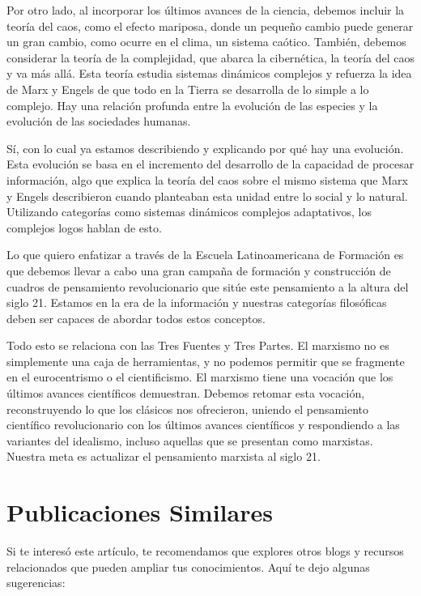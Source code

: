 \documentclass[
  jou,
  floatsintext,
  longtable,
  a4paper,
  nolmodern,
  notxfonts,
  notimes,
  12pt,
  colorlinks=true,linkcolor=blue,citecolor=blue,urlcolor=blue]{apa7}
\begin{document}
Por otro lado, al incorporar los últimos avances de la ciencia, debemos
incluir la teoría del caos, como el efecto mariposa, donde un pequeño
cambio puede generar un gran cambio, como ocurre en el clima, un sistema
caótico. También, debemos considerar la teoría de la complejidad, que
abarca la cibernética, la teoría del caos y va más allá. Esta teoría
estudia sistemas dinámicos complejos y refuerza la idea de Marx y Engels
de que todo en la Tierra se desarrolla de lo simple a lo complejo. Hay
una relación profunda entre la evolución de las especies y la evolución
de las sociedades humanas.

Sí, con lo cual ya estamos describiendo y explicando por qué hay una
evolución. Esta evolución se basa en el incremento del desarrollo de la
capacidad de procesar información, algo que explica la teoría del caos
sobre el mismo sistema que Marx y Engels describieron cuando planteaban
esta unidad entre lo social y lo natural. Utilizando categorías como
sistemas dinámicos complejos adaptativos, los complejos logos hablan de
esto.

Lo que quiero enfatizar a través de la Escuela Latinoamericana de
Formación es que debemos llevar a cabo una gran campaña de formación y
construcción de cuadros de pensamiento revolucionario que sitúe este
pensamiento a la altura del siglo 21. Estamos en la era de la
información y nuestras categorías filosóficas deben ser capaces de
abordar todos estos conceptos.

Todo esto se relaciona con las Tres Fuentes y Tres Partes. El marxismo
no es simplemente una caja de herramientas, y no podemos permitir que se
fragmente en el eurocentrismo o el cientificismo. El marxismo tiene una
vocación que los últimos avances científicos demuestran. Debemos retomar
esta vocación, reconstruyendo lo que los clásicos nos ofrecieron,
uniendo el pensamiento científico revolucionario con los últimos avances
científicos y respondiendo a las variantes del idealismo, incluso
aquellas que se presentan como marxistas. Nuestra meta es actualizar el
pensamiento marxista al siglo 21.

\section{Publicaciones Similares}\label{publicaciones-similares}

Si te interesó este artículo, te recomendamos que explores otros blogs y
recursos relacionados que pueden ampliar tus conocimientos. Aquí te dejo
algunas sugerencias:
\end{document}
